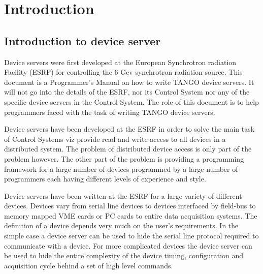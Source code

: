 
\chapter{Introduction}

\section{Introduction to device server}

Device servers were first developed at the European Synchrotron radiation
Facility (ESRF) for controlling the 6 Gev synchrotron
radiation source. This document is a Programmer's Manual on how to
write TANGO device servers. It will not go into the details of the
ESRF, nor its Control System nor any of the specific
device servers in the Control System. The role of this document is
to help programmers faced with the task of writing TANGO device servers.

Device servers have been developed at the ESRF in order
to solve the main task of Control Systems viz provide read and write
access to all devices in a distributed system. The problem of distributed
device access is only part of the problem however. The other part
of the problem is providing a programming framework for a large number
of devices programmed by a large number of programmers each having
different levels of experience and style.

Device servers have been written at the ESRF for a large
variety of different devices. Devices vary from serial line devices
to devices interfaced by field-bus to memory mapped VME cards or PC
cards to entire data acquisition systems. The definition of a device
depends very much on the user's requirements. In the simple case a
device server can be used to hide the serial line protocol required
to communicate with a device. For more complicated devices the device
server can be used to hide the entire complexity of the device timing,
configuration and acquisition cycle behind a set of high level commands.


